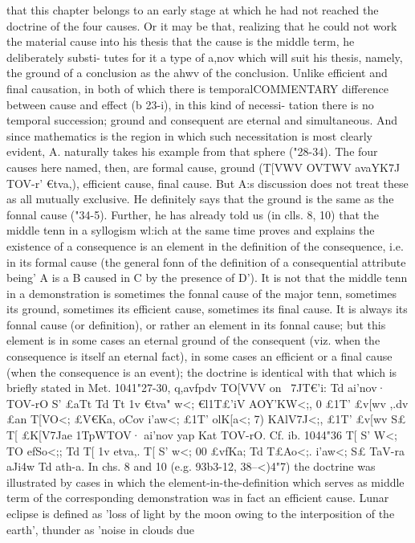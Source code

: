 {{{{{{{{{{{{{{{{{{{{{{{{{{{{{{{{{{{{{{{{{{{{{{{{{{{{{{{that this chapter belongs to an early stage at which he had not
reached the doctrine of the four causes. Or it may be that,
realizing that he could not work the material cause into his
thesis that the cause is the middle term, he deliberately substi-
tutes for it a type of a,nov which will suit his thesis, namely, the
ground of a conclusion as the ahwv of the conclusion. Unlike
efficient and final causation, in both of which there is temporalCOMMENTARY
difference between cause and effect (b 23-{i), in this kind of necessi-
tation there is no temporal succession; ground and consequent
are eternal and simultaneous. And since mathematics is the
region in which such necessitation is most clearly evident, A.
naturally takes his example from that sphere ("28-34).
The four causes here named, then, are formal cause, ground
(T[VWV OVTWV avaYK7J TOV-r' €tva,), efficient cause, final cause. But
A:s discussion does not treat these as all mutually exclusive.
He definitely says that the ground is the same as the fonnal
cause ("34-5). Further, he has already told us (in clls. 8, 10) that
the middle tenn in a syllogism wl:ich at the same time proves
and explains the existence of a consequence is an element in the
definition of the consequence, i.e. in its formal cause (the general
fonn of the definition of a consequential attribute being' A is
a B caused in C by the presence of D'). It is not that the middle
tenn in a demonstration is sometimes the fonnal cause of the
major tenn, sometimes its ground, sometimes its efficient cause,
sometimes its final cause. It is always its fonnal cause (or
definition), or rather an element in its fonnal cause; but this
element is in some cases an eternal ground of the consequent
(viz. when the consequence is itself an eternal fact), in some cases
an efficient or a final cause (when the consequence is an event);
the doctrine is identical with that which is briefly stated in Met.
1041"27-30, q,avfpdv TO[VVV on ~7JT€'i: Td ai'nov· TOV-rO S' £aTt Td Tt
1}v €tva" w<; €l1T£'iV AOY'KW<;, 0 £1T' £v[wv ,.dv £an T[VO<; £V€Ka, oCov
i'aw<; £1T' olK[a<; 7) KAlV7J<;, £1T' £v[wv S£ T[ £K[V7Jae 1TpWTOV· ai'nov yap
Kat TOV-rO. Cf. ib. 1044"36 T[ S' W<; TO efSo<;; Td T[ 1}v etva,. T[ S' w<;
00 £vfKa; Td T£Ao<;. i'aw<; S£ TaV-ra aJi4w Td ath-a. In chs. 8 and 10
(e.g. 93b3-12, 38--<)4"7) the doctrine was illustrated by cases in
which the element-in-the-definition which serves as middle term
of the corresponding demonstration was in fact an efficient cause.
Lunar eclipse is defined as 'loss of light by the moon owing to
the interposition of the earth', thunder as 'noise in clouds due
}}}}}}}}}}}}}}}}}}}}}}}}}}}}}}}}}}}}}}}}}}}}}}}}}}}}}}
